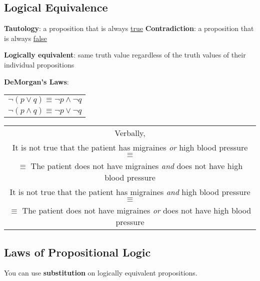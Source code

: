 \subsection{Logical Equivalence}

\begin{center}
  \textbf{Tautology}: a proposition that is always \underline{true}
  \qquad
  \textbf{Contradiction}: a proposition that is always \underline{false}
\end{center}

\textbf{Logically equivalent}: same truth value regardless of the truth values of their individual propositions

\textbf{DeMorgan's Laws}:
\qquad
\begin{tabular}{c}
  $\lnot (p \lor q) \equiv \lnot p \land \lnot q$ \\
  $\lnot (p \land q) \equiv \lnot p \lor \lnot q$
\end{tabular}

\begin{center}
  \begin{tabular}{c}
    Verbally,                                                                                   \\
    It is not true that the patient has migraines \textit{or} high blood pressure $\equiv$      \\
    $\equiv$ The patient does not have migraines \textit{and} does not have high blood pressure \\
    \hline
    It is not true that the patient has migraines \textit{and} high blood pressure $\equiv$     \\
    $\equiv$ The patient does not have migraines \textit{or} does not have high blood pressure  \\
  \end{tabular}
\end{center}

\subsection{Laws of Propositional Logic}

\begin{center}
  You can use \textbf{substitution} on logically equivalent propositions.
\end{center}


